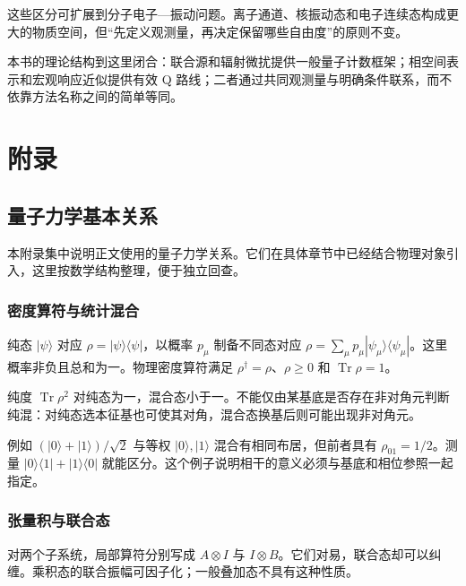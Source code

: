 \documentclass[UTF8,a4paper,zihao=-4,openany,fontset=fandol]{ctexbook}
\begin{document}
这些区分可扩展到分子电子—振动问题。离子通道、核振动态和电子连续态构成更大的物质空间，但“先定义观测量，再决定保留哪些自由度”的原则不变。



本书的理论结构到这里闭合：联合源和辐射微扰提供一般量子计数框架；相空间表示和宏观响应近似提供有效 Q 路线；二者通过共同观测量与明确条件联系，而不依靠方法名称之间的简单等同。


\appendix
\part*{附录}


\chapter{量子力学基本关系}\label{ch:A}


本附录集中说明正文使用的量子力学关系。它们在具体章节中已经结合物理对象引入，这里按数学结构整理，便于独立回查。



\section{密度算符与统计混合}\label{sec:A:1}


纯态 $|\psi\rangle$ 对应 $\rho=|\psi\rangle\langle\psi|$，以概率 $p_\mu$ 制备不同态对应 $\rho=\sum_\mu p_\mu|\psi_\mu\rangle\langle\psi_\mu|$。这里概率非负且总和为一。物理密度算符满足 $\rho^\dagger=\rho$、$\rho\ge0$ 和 $\operatorname{Tr}\rho=1$。



纯度 $\operatorname{Tr}\rho^2$ 对纯态为一，混合态小于一。不能仅由某基底是否存在非对角元判断纯混：对纯态选本征基也可使其对角，混合态换基后则可能出现非对角元。



例如 $(|0\rangle+|1\rangle)/\sqrt2$ 与等权 $|0\rangle,|1\rangle$ 混合有相同布居，但前者具有 $\rho_{01}=1/2$。测量 $|0\rangle\langle1|+|1\rangle\langle0|$ 就能区分。这个例子说明相干的意义必须与基底和相位参照一起指定。



\section{张量积与联合态}\label{sec:A:2}


对两个子系统，局部算符分别写成 $A\otimes I$ 与 $I\otimes B$。它们对易，联合态却可以纠缠。乘积态的联合振幅可因子化；一般叠加态不具有这种性质。
\end{document}
